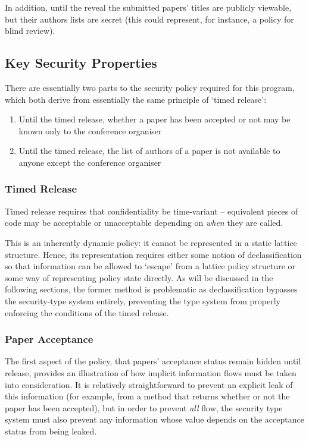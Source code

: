 In addition, until the reveal the submitted papers' titles are publicly viewable, but their authors lists are secret (this could represent, for instance, a policy for blind review).

\subsection{Key Security Properties}

There are essentially two parts to the security policy required for this program, which both derive from essentially the same principle of `timed release':

\begin{enumerate}
	\item Until the timed release, whether a paper has been accepted or not may be known only to the conference organiser
	
	\item Until the timed release, the list of authors of a paper is not available to anyone except the conference organiser
\end{enumerate}

\subsubsection{Timed Release}

Timed release requires that confidentiality be time-variant -- equivalent pieces of code may be acceptable or unacceptable depending on \textit{when} they are called.

This is an inherently dynamic policy: it cannot be represented in a static lattice structure. Hence, its representation requires either some notion of declassification so that information can be allowed to `escape' from a lattice policy structure or some way of representing policy state directly. As will be discussed in the following sections, the former method is problematic as declassification bypasses the security-type system entirely, preventing the type system from properly enforcing the conditions of the timed release.

\subsubsection{Paper Acceptance}

The first aspect of the policy, that papers' acceptance status remain hidden until release, provides an illustration of how implicit information flows must be taken into consideration. It is relatively straightforward to prevent an explicit leak of this information (for example, from a method that returns whether or not the paper has been accepted), but in order to prevent \textit{all} flow, the security type system must also prevent any information whose value depends on the acceptance status from being leaked.

